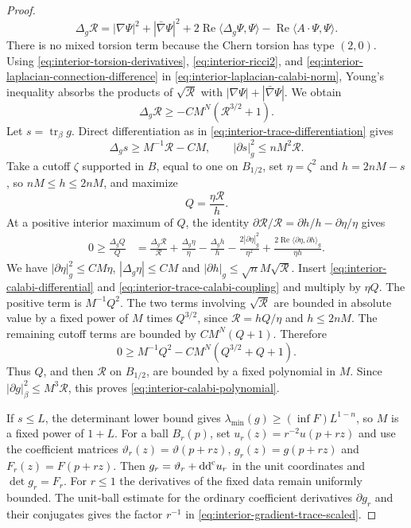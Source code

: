 \begin{proof}
\begin{equation}\label{eq:interior-laplacian-calabi-norm}
  \Delta_g\mathcal R
  =|\nabla\Psi|^2+|\bar\nabla\Psi|^2
   +2\operatorname{Re}\langle\Delta_g\Psi,\Psi\rangle
   -\operatorname{Re}\langle A\mathbin{\cdot}\Psi,\Psi\rangle.
\end{equation}
There is no mixed torsion term because the Chern torsion has type $(2,0)$. Using \eqref{eq:interior-torsion-derivatives}, \eqref{eq:interior-ricci2}, and \eqref{eq:interior-laplacian-connection-difference} in \eqref{eq:interior-laplacian-calabi-norm}, Young's inequality absorbs the products of $\sqrt{\mathcal R}$ with $|\nabla\Psi|+|\bar\nabla\Psi|$. We obtain
\begin{equation}\label{eq:interior-calabi-differential}
  \Delta_g\mathcal R\geq-CM^N(\mathcal R^{3/2}+1).
\end{equation}
Let $s=\operatorname{tr}_\beta g$. Direct differentiation as in \eqref{eq:interior-trace-differentiation} gives
\begin{equation}\label{eq:interior-trace-calabi-coupling}
  \Delta_gs\geq M^{-1}\mathcal R-CM,
  \qquad
  |\partial s|_g^2\leq nM^2\mathcal R.
\end{equation}
Take a cutoff $\zeta$ supported in $B$, equal to one on $B_{1/2}$, set $\eta=\zeta^2$ and $h=2nM-s$, so $nM\leq h\leq2nM$, and maximize
\[
  Q=\frac{\eta\mathcal R}{h}.
\]
At a positive interior maximum of $Q$, the identity
$\partial\mathcal R/\mathcal R=\partial h/h-\partial\eta/\eta$ gives
\[
 \begin{split}
 0\geq\frac{\Delta_gQ}{Q}
 &=\frac{\Delta_g\mathcal R}{\mathcal R}
   +\frac{\Delta_g\eta}{\eta}-\frac{\Delta_gh}{h}
   -\frac{2|\partial\eta|_g^2}{\eta^2}
   +\frac{2\operatorname{Re}\langle\partial\eta,\partial h\rangle_g}{\eta h}.
 \end{split}
\]
We have $|\partial\eta|_g^2\leq CM\eta$,
$|\Delta_g\eta|\leq CM$ and
$|\partial h|_g\leq\sqrt n M\sqrt{\mathcal R}$.
Insert \eqref{eq:interior-calabi-differential} and
\eqref{eq:interior-trace-calabi-coupling} and multiply by $\eta Q$.
The positive term is $M^{-1}Q^2$. The two terms involving
$\sqrt{\mathcal R}$ are bounded in absolute value by a fixed power of
$M$ times $Q^{3/2}$, since $\mathcal R=hQ/\eta$ and $h\leq2nM$.
The remaining cutoff terms are bounded by $CM^N(Q+1)$. Therefore
\[
 0\geq M^{-1}Q^2-CM^N(Q^{3/2}+Q+1).
\]
Thus $Q$, and then $\mathcal R$ on $B_{1/2}$, are bounded by a fixed polynomial in $M$. Since $|\partial g|_\beta^2\leq M^3\mathcal R$, this proves \eqref{eq:interior-calabi-polynomial}.

If $s\leq L$, the determinant lower bound gives $\lambda_{\min}(g)\geq(\inf F)L^{1-n}$, so $M$ is a fixed power of $1+L$. For a ball $B_r(p)$, set $u_r(z)=r^{-2}u(p+rz)$ and use the
coefficient matrices $\vartheta_r(z)=\vartheta(p+rz)$,
$g_r(z)=g(p+rz)$ and $F_r(z)=F(p+rz)$. Then
$g_r=\vartheta_r+\mathrm{dd}^{\mathrm{c}} u_r$ in the unit coordinates and
$\det g_r=F_r$. For $r\leq1$ the derivatives of the fixed data remain
uniformly bounded. The unit-ball estimate for the ordinary coefficient derivatives $\partial g_r$ and their conjugates gives the
factor $r^{-1}$ in \eqref{eq:interior-gradient-trace-scaled}.
\end{proof}

